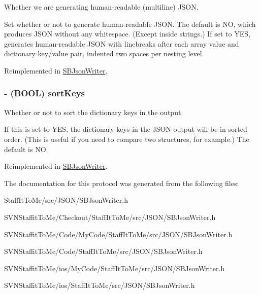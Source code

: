 \-Whether we are generating human-\/readable (multiline) \-J\-S\-O\-N. 

\-Set whether or not to generate human-\/readable \-J\-S\-O\-N. \-The default is \-N\-O, which produces \-J\-S\-O\-N without any whitespace. (\-Except inside strings.) \-If set to \-Y\-E\-S, generates human-\/readable \-J\-S\-O\-N with linebreaks after each array value and dictionary key/value pair, indented two spaces per nesting level. 

\-Reimplemented in \hyperlink{interface_s_b_json_writer_a16ca84860a2ee76a03b567dc5181a851}{\-S\-B\-Json\-Writer}.

\hypertarget{protocol_s_b_json_writer-p_ad424f1c19aead35d04509bfa549f7290}{
\subsubsection[{sort\-Keys}]{\setlength{\rightskip}{0pt plus 5cm}-\/ (\-B\-O\-O\-L) sort\-Keys}}
\label{protocol_s_b_json_writer-p_ad424f1c19aead35d04509bfa549f7290}


\-Whether or not to sort the dictionary keys in the output. 

\-If this is set to \-Y\-E\-S, the dictionary keys in the \-J\-S\-O\-N output will be in sorted order. (\-This is useful if you need to compare two structures, for example.) \-The default is \-N\-O. 

\-Reimplemented in \hyperlink{interface_s_b_json_writer_af25807a58a322b56cb5d3593532228e5}{\-S\-B\-Json\-Writer}.



\-The documentation for this protocol was generated from the following files\-:\begin{DoxyCompactItemize}
\item 
\-Staff\-It\-To\-Me/src/\-J\-S\-O\-N/\-S\-B\-Json\-Writer.\-h\item 
\-S\-V\-N\-Staffit\-To\-Me/\-Checkout/\-Staff\-It\-To\-Me/src/\-J\-S\-O\-N/\-S\-B\-Json\-Writer.\-h\item 
\-S\-V\-N\-Staffit\-To\-Me/\-Code/\-My\-Code/\-Staff\-It\-To\-Me/src/\-J\-S\-O\-N/\-S\-B\-Json\-Writer.\-h\item 
\-S\-V\-N\-Staffit\-To\-Me/\-Code/\-Staff\-It\-To\-Me/src/\-J\-S\-O\-N/\-S\-B\-Json\-Writer.\-h\item 
\-S\-V\-N\-Staffit\-To\-Me/ios/\-My\-Code/\-Staff\-It\-To\-Me/src/\-J\-S\-O\-N/\-S\-B\-Json\-Writer.\-h\item 
\-S\-V\-N\-Staffit\-To\-Me/ios/\-Staff\-It\-To\-Me/src/\-J\-S\-O\-N/\-S\-B\-Json\-Writer.\-h\end{DoxyCompactItemize}
